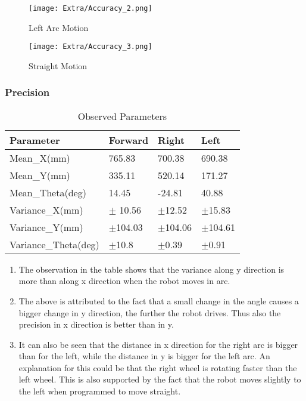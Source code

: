 	\begin{figure}[H]
		\centering
		\texttt{[image: Extra/Accuracy\_2.png]}
		\caption{Left Arc Motion}
	\end{figure}
	
	\begin{figure}[H]
		\centering
		\texttt{[image: Extra/Accuracy\_3.png]}
		\caption{Straight Motion}
	\end{figure}
	
 
\color{black}
\subsubsection{Precision}

\begin{table}[ht]				
	\centering
	\begin{tabular}{ | C{3cm} | C{3cm}|  C{3cm} | C{3cm} |} 
		\hline
		\textbf{Parameter} & \textbf{Forward} & \textbf{Right} & \textbf{Left}\\ 
		\hline
		Mean\_X(mm)  & 765.83 & 700.38 & 690.38  \\ 
		\hline
		Mean\_Y(mm)  & 335.11 & 520.14 & 171.27  \\  
		\hline
		Mean\_Theta(deg)  & 14.45 & -24.81 & 40.88  \\ 
		\hline
		Variance\_X(mm)  & $\pm$ 10.56 & $\pm$12.52 & $\pm$15.83 \\  
		\hline
		Variance\_Y(mm)  & $\pm$104.03 & $\pm$104.06 & $\pm$104.61  \\ 
		\hline
		Variance\_Theta(deg)  & $\pm$10.8 & $\pm$0.39 & $\pm$0.91  \\  
		\hline
	\end{tabular}
	\caption{Observed Parameters}
	\label{Tab:Tcr}
\end{table}

\begin{enumerate}
	\item
	The observation in the table shows that the variance along y direction is more than along x direction when the robot moves in arc.
	\item
	The above is attributed to the fact that a small change in the angle
	causes a bigger change in y direction, the further the robot drives.
	Thus also the precision in x direction is better than in y.
	\item
	It can also be seen that the distance in x direction for the right arc
	is bigger than for the left, while the distance in y is bigger for the
	left arc. An explanation for this could be that the right wheel is rotating faster than the left wheel. This is also supported by the fact that the robot moves slightly to the left when programmed to move straight.
\end{enumerate}


